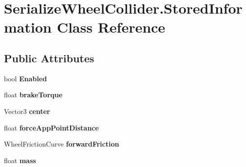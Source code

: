 \hypertarget{class_serialize_wheel_collider_1_1_stored_information}{}\section{Serialize\+Wheel\+Collider.\+Stored\+Information Class Reference}
\label{class_serialize_wheel_collider_1_1_stored_information}
\subsection*{Public Attributes}
\begin{DoxyCompactItemize}
\item 
\mbox{\label{class_serialize_wheel_collider_1_1_stored_information_a96fded73b7397ae3a0bb9bdbc3d6bc58}} 
bool {\bfseries Enabled}
\item 
\mbox{\label{class_serialize_wheel_collider_1_1_stored_information_a936b9be2086f62d60972d0cf09d08f7c}} 
float {\bfseries brake\+Torque}
\item 
\mbox{\label{class_serialize_wheel_collider_1_1_stored_information_a4d3fd49db44a8f0adac5a07a33dcb911}} 
Vector3 {\bfseries center}
\item 
\mbox{\label{class_serialize_wheel_collider_1_1_stored_information_ac2488ad2ea6c9d13564d3437216c6a28}} 
float {\bfseries force\+App\+Point\+Distance}
\item 
\mbox{\label{class_serialize_wheel_collider_1_1_stored_information_af02b1607cb9360a6128e058c7a38cab7}} 
Wheel\+Friction\+Curve {\bfseries forward\+Friction}
\item 
\mbox{\label{class_serialize_wheel_collider_1_1_stored_information_a90f8bee727dedaea08f403b696dca2f7}} 
float {\bfseries mass}
\item 
\mbox{\label{class_serialize_wheel_collider_1_1_stored_information_acbf3d9857300e788a48b1519f37a35db}} 

\end{DoxyCompactItemize}
